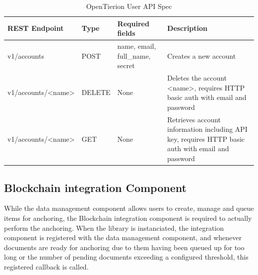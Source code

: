 \documentclass[12pt,msc,a4paper,oneside]{ucl_thesis}
\begin{document}
\begin{table}
    \begin{tabularx}{\textwidth}{| l l X X |}
        \hline
        \textbf{REST Endpoint} & \textbf{Type} & \textbf{Required fields} & \textbf{Description} \\
        \hline
        v1/accounts & POST & name, email, full\_name, secret & Creates a new account \\
        v1/accounts/\textless name\textgreater & DELETE & None & Deletes the account \textless name\textgreater, requires HTTP basic auth with email and password  \\
        v1/accounts/\textless name\textgreater & GET & None & Retrieves account information including API key, requires HTTP basic auth with email and password \\
        \hline
    \end{tabularx}
    \caption{OpenTierion User API Spec}
    \label{tab:opentierion_user_api}
\end{table}

\subsection{Blockchain integration Component} \label{sec:opentierion_backends}
While the data management component allows users to create, manage and queue items for anchoring, the Blockchain integration component is required to actually perform the anchoring. When the library is instanciated, the integration component is registered with the data management component, and whenever documents are ready for anchoring due to them having been queued up for too long or the number of pending documents exceeding a configured threshold, this registered callback is called.
\end{document}
